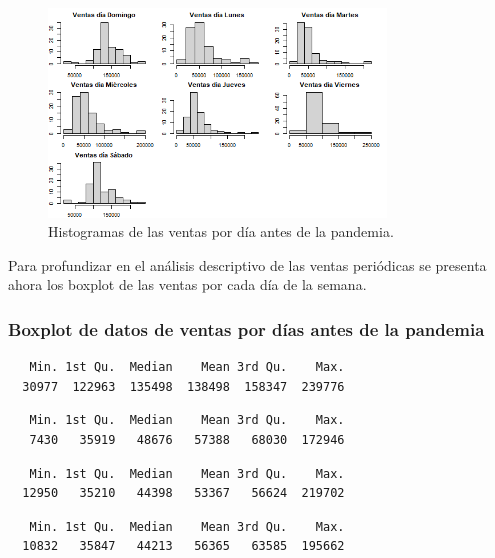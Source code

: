 \documentclass[
  us-letterpaper,
]{scrreprt}
\theoremstyle{plain}
\theoremstyle{plain}
\theoremstyle{definition}
\theoremstyle{remark}
\begin{document}
\begin{figure}[H]

{\centering \includegraphics[width=0.8\textwidth,height=\textheight]{his_1.png}

}

\caption{Histogramas de las ventas por día antes de la pandemia.}

\end{figure}%

Para profundizar en el análisis descriptivo de las ventas periódicas se
presenta ahora los boxplot de las ventas por cada día de la semana.

\subsubsection{Boxplot de datos de ventas por días antes de la
pandemia}\label{boxplot-de-datos-de-ventas-por-duxedas-antes-de-la-pandemia}

\begin{verbatim}
   Min. 1st Qu.  Median    Mean 3rd Qu.    Max. 
  30977  122963  135498  138498  158347  239776 
\end{verbatim}

\begin{verbatim}
   Min. 1st Qu.  Median    Mean 3rd Qu.    Max. 
   7430   35919   48676   57388   68030  172946 
\end{verbatim}

\begin{verbatim}
   Min. 1st Qu.  Median    Mean 3rd Qu.    Max. 
  12950   35210   44398   53367   56624  219702 
\end{verbatim}

\begin{verbatim}
   Min. 1st Qu.  Median    Mean 3rd Qu.    Max. 
  10832   35847   44213   56365   63585  195662 
\end{verbatim}
\end{document}
